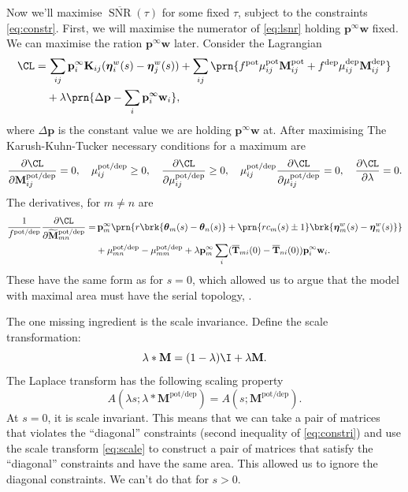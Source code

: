 \documentclass[12pt]{article}
\newcommand{\pr}{\mathbf{p}}
\newcommand{\eq}{\pr^\infty}
\newcommand{\fpt}{\mathbf{T}}
\newcommand{\fptb}{\overline{\fpt}}
\newcommand{\etw}{\boldsymbol{\eta}^w}
\newcommand{\thb}{\boldsymbol{\theta}}
\newcommand{\w}{\mathbf{w}}
\newcommand{\M}{\mathbf{M}}
\newcommand{\enc}{\mathbf{K}}
\newcommand{\pot}{^{\text{pot}}}
\newcommand{\dep}{^{\text{dep}}}
\newcommand{\potdep}{^{\text{pot/dep}}}
\newcommand{\Mh}{\widetilde{\M}}
\DeclareMathOperator{\snr}{SNR}
\newcommand{\snrb}{\overline{\snr}}
\renewcommand{\pdiff}[2]{\frac{\partial #1}{\partial #2}}
\begin{document}
Now we'll maximise $\snrb(\tau)$ for some fixed $\tau$, subject to the constraints \eqref{eq:constr}.
First, we will maximise the numerator of \eqref{eq:lsnr} holding $\eq\w$ fixed.
We can maximise the ration \wrt $\eq\w$ later.
Consider the Lagrangian
%
\begin{equation}\label{eq:finitelagrangian}
\begin{aligned}
  \CL =&\, \sum_{ij} \eq_i \enc_{ij} (\etw_i(s) - \etw_j(s))
        +\sum_{i j} \prn{ f\pot\mu\pot_{ij} \M\pot_{ij} + f\dep\mu\dep_{ij} \M\dep_{ij} }\\
        &+ \lambda \prn{ \Delta\pr - \sum_i \eq_i\w_i },
\end{aligned}
\end{equation}
%
where $\Delta\pr$ is the constant value we are holding $\eq\w$ at.
After maximising
The Karush-Kuhn-Tucker necessary conditions for a maximum are
%
\begin{equation}\label{eq:KTfinite}
  \pdiff{\CL}{\M\potdep_{ij}} = 0, \quad
  \mu\potdep_{ij} \geq 0, \quad
  \pdiff{\CL}{\mu\potdep_{ij}} \geq 0, \quad
  \mu\potdep_{ij}\pdiff{\CL}{\mu\potdep_{ij}} = 0, \quad
  \pdiff{\CL}{\lambda} = 0.
\end{equation}
%
The derivatives, for $m \neq n$ are
%
\begin{equation}\label{eq:finitederivs}
\begin{aligned}
  \frac{1}{f\potdep} \pdiff{\CL}{\Mh\potdep_{mn}} =& \,
      \eq_m \prn{ r \brk{\thb_m(s) - \thb_n(s)}
     +\prn{rc_m(s) \pm 1} \brk{\etw_m(s) - \etw_n(s)} } \\
     &+ \mu\potdep_{mn} -  \mu\potdep_{mm}
     + \lambda \eq_m \sum_i (\fptb_{mi}(0)-\fptb_{ni}(0)) \eq_i\w_i.
\end{aligned}
\end{equation}
%
These have the same form as for $s=0$, which allowed us to argue that the model with maximal area must have the serial topology, \cite{Leibold2008serial,Ben-DayanRubin2007sparse}.

The one missing ingredient is the scale invariance.
Define the scale transformation:
%
\begin{equation}\label{eq:scale}
  \lambda * \M = (1-\lambda)\I + \lambda \M.
\end{equation}
%
The Laplace transform has the following scaling property
%
\begin{equation}\label{eqlaplacescale}
  A(\lambda s;\lambda * \M\potdep) = A(s;\M\potdep).
\end{equation}
%
At $s=0$, it is scale invariant.
This means that we can take a pair of matrices that violates the ``diagonal'' constraints (second inequality of \eqref{eq:constri}) and use the scale transform \eqref{eq:scale} to construct a pair of matrices that satisfy the ``diagonal'' constraints and have the same area.
This allowed us to ignore the diagonal constraints.
We can't do that for $s>0$.
\end{document}
